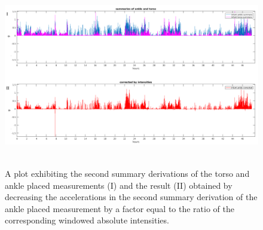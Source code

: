 \documentclass{article}
\begin{document}
{\begin{figure}[h!]
\includegraphics[width=15cm, height=8cm]{bandpass_summary_example_C.png}
\caption{A plot exhibiting the second summary derivations of the torso and ankle placed measurements (I) and the result (II) obtained by decreasing the accelerations in the second summary derivation of the ankle placed measurement by a factor equal to the ratio of the corresponding windowed absolute intensities.}
\end{figure}

}
\end{document}
